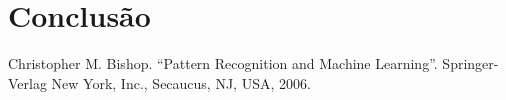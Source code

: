 \documentclass[conference]{IEEEtran}
\begin{document}
\section{Conclusão} \label{sec:conc}


\begin{thebibliography}{00}
 Christopher M. Bishop. ``Pattern Recognition and Machine Learning''. Springer-Verlag New York, Inc., Secaucus, NJ, USA, 2006.
\end{thebibliography}
\end{document}

